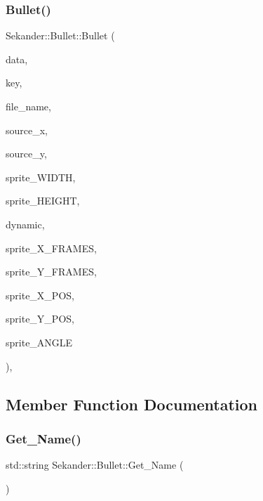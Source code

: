 \mbox{\label{classSekander_1_1Bullet_a003f538d802703d9a85898f4c7c9aabd}} 
\subsubsection{\texorpdfstring{Bullet()}{Bullet()}\hspace{0.1cm}{\footnotesize\ttfamily [2/2]}}
{\footnotesize\ttfamily Sekander\+::\+Bullet\+::\+Bullet (\begin{DoxyParamCaption}\item[{\hyperlink{namespaceSekander_a1d69b002ba2d23020901c28f0def5e16}{Game\+Data\+Ref}}]{data,  }\item[{std\+::string}]{key,  }\item[{std\+::string}]{file\+\_\+name,  }\item[{int}]{source\+\_\+x,  }\item[{int}]{source\+\_\+y,  }\item[{int}]{sprite\+\_\+\+W\+I\+D\+TH,  }\item[{int}]{sprite\+\_\+\+H\+E\+I\+G\+HT,  }\item[{bool}]{dynamic,  }\item[{int}]{sprite\+\_\+\+X\+\_\+\+F\+R\+A\+M\+ES,  }\item[{int}]{sprite\+\_\+\+Y\+\_\+\+F\+R\+A\+M\+ES,  }\item[{float}]{sprite\+\_\+\+X\+\_\+\+P\+OS,  }\item[{float}]{sprite\+\_\+\+Y\+\_\+\+P\+OS,  }\item[{float}]{sprite\+\_\+\+A\+N\+G\+LE }\end{DoxyParamCaption})\hspace{0.3cm}{\ttfamily [inline]}, {\ttfamily [explicit]}}



\subsection{Member Function Documentation}
\mbox{\label{classSekander_1_1Bullet_a0014d85f72f42816b9e095c4d2fe8199}} 
\subsubsection{\texorpdfstring{Get\+\_\+\+Name()}{Get\_Name()}}
{\footnotesize\ttfamily std\+::string Sekander\+::\+Bullet\+::\+Get\+\_\+\+Name (\begin{DoxyParamCaption}{ }\end{DoxyParamCaption})\hspace{0.3cm}{\ttfamily [inline]}}

